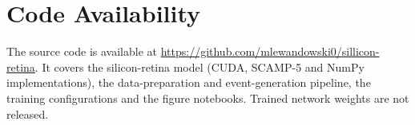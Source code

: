 \section*{Code Availability}
The source code is available at \url{https://github.com/mlewandowski0/sillicon-retina}. It covers the
silicon-retina model (CUDA, SCAMP-5 and NumPy implementations), the data-preparation and
event-generation pipeline, the training configurations and the figure notebooks.
Trained network weights are not released.
